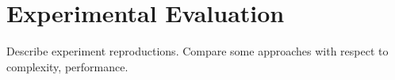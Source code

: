 \section{Experimental Evaluation}

Describe experiment reproductions.
Compare some approaches with respect to complexity, performance.
